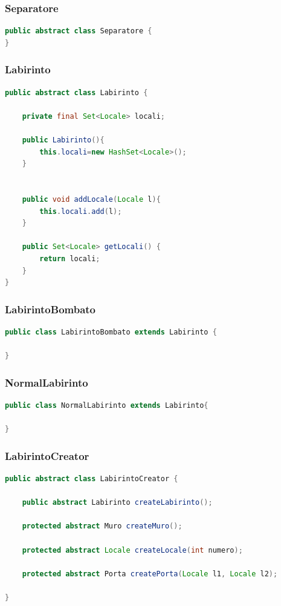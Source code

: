 \documentclass{article}
\begin{document}
\subsubsection{Separatore}
\begin{lstlisting}[language=Java]
public abstract class Separatore {	
}
\end{lstlisting}


\subsubsection{Labirinto}
\begin{lstlisting}[language=Java]
public abstract class Labirinto {

	private final Set<Locale> locali;
	
	public Labirinto(){
		this.locali=new HashSet<Locale>();
	}

	
	public void addLocale(Locale l){
		this.locali.add(l);
	}

	public Set<Locale> getLocali() {
		return locali;
	}
}
\end{lstlisting}

\subsubsection{LabirintoBombato}
\begin{lstlisting}[language=Java]
public class LabirintoBombato extends Labirinto {

}
\end{lstlisting}

\subsubsection{NormalLabirinto}
\begin{lstlisting}[language=Java]
public class NormalLabirinto extends Labirinto{
	
}
\end{lstlisting}

\subsubsection{LabirintoCreator}
\begin{lstlisting}[language=Java]
public abstract class LabirintoCreator {
	
	public abstract Labirinto createLabirinto();

	protected abstract Muro createMuro();
	
	protected abstract Locale createLocale(int numero);
	
	protected abstract Porta createPorta(Locale l1, Locale l2);
	
}
\end{lstlisting}
\end{document}
